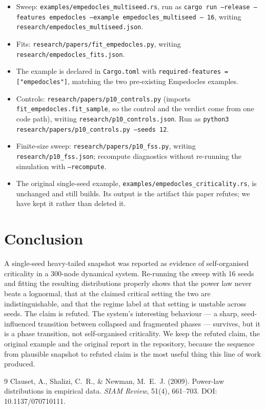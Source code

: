 \documentclass[11pt]{article}
\begin{document}
\begin{itemize}
\item Sweep: \texttt{examples/empedocles\_multiseed.rs}, run as
  \texttt{cargo run --release --features empedocles --example
  empedocles\_multiseed -- 16}, writing
  \texttt{research/empedocles\_multiseed.json}.
\item Fits: \texttt{research/papers/fit\_empedocles.py}, writing
  \texttt{research/empedocles\_fits.json}.
\item The example is declared in \texttt{Cargo.toml} with
  \texttt{required-features = ["empedocles"]}, matching the two pre-existing
  Empedocles examples.
\item Controls: \texttt{research/papers/p10\_controls.py} (imports
  \texttt{fit\_empedocles.fit\_sample}, so the control and the verdict come
  from one code path), writing \texttt{research/p10\_controls.json}.
  Run as \texttt{python3 research/papers/p10\_controls.py --seeds 12}.
\item Finite-size sweep: \texttt{research/papers/p10\_fss.py}, writing
  \texttt{research/p10\_fss.json}; recompute diagnostics without re-running
  the simulation with \texttt{--recompute}.
\item The original single-seed example,
  \texttt{examples/empedocles\_criticality.rs}, is unchanged and still
  builds. Its output is the artifact this paper refutes; we have kept it
  rather than deleted it.
\end{itemize}

\section{Conclusion}

A single-seed heavy-tailed snapshot was reported as evidence of
self-organised criticality in a 300-node dynamical system. Re-running the
sweep with 16 seeds and fitting the resulting distributions properly shows
that the power law never beats a lognormal, that at the claimed critical
setting the two are indistinguishable, and that the regime label at that
setting is unstable across seeds. The claim is refuted. The system's
interesting behaviour --- a sharp, seed-influenced transition between
collapsed and fragmented phases --- survives, but it is a phase transition,
not self-organised criticality. We keep the refuted claim, the original
example and the original report in the repository, because the sequence
from plausible snapshot to refuted claim is the most useful thing this line
of work produced.

\begin{thebibliography}{9}
Clauset, A., Shalizi, C.~R., \& Newman, M.~E.~J. (2009).
\newblock Power-law distributions in empirical data.
\newblock \emph{SIAM Review}, 51(4), 661--703.
\newblock DOI: 10.1137/070710111.
\end{thebibliography}
\end{document}
